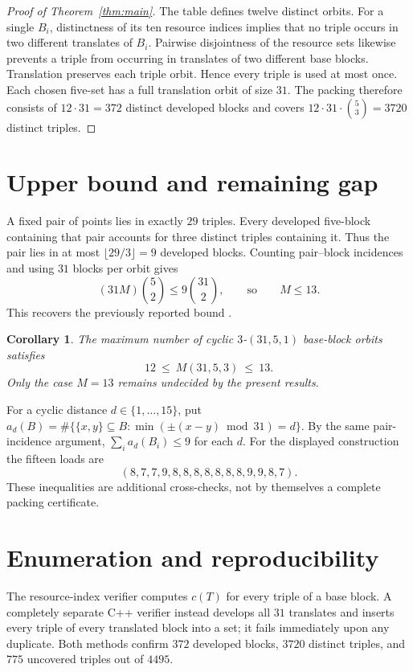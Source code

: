 \documentclass[11pt,a4paper]{article}
\newtheorem{corollary}{Corollary}
\begin{document}
\begin{proof}[Proof of Theorem~\ref{thm:main}]
The table defines twelve distinct orbits. For a single $B_i$,
distinctness of its ten resource indices implies that no triple occurs
in two different translates of $B_i$. Pairwise disjointness of the
resource sets likewise prevents a triple from occurring in translates
of two different base blocks. Translation preserves each triple orbit.
Hence every triple is used at most once. Each chosen five-set has a
full translation orbit of size $31$. The packing therefore consists of
$12\cdot31=372$ distinct developed blocks and covers
$12\cdot31\cdot\binom53=3720$ distinct triples.
\end{proof}

\section{Upper bound and remaining gap}
A fixed pair of points lies in exactly $29$ triples. Every developed
five-block containing that pair accounts for three distinct triples
containing it. Thus the pair lies in at most $\lfloor29/3\rfloor=9$
developed blocks. Counting pair--block incidences and using $31$ blocks
per orbit gives
\[
 (31M)\binom{5}{2}\leq 9\binom{31}{2},
 \qquad\text{so}\qquad M\leq13.
\]
This recovers the previously reported bound \cite{theoremdb,bailey}.

\begin{corollary}
The maximum number of cyclic $3$-$(31,5,1)$ base-block orbits satisfies
\[\boxed{12\ \leq\ M(31,5,3)\ \leq\ 13}.\]
Only the case $M=13$ remains undecided by the present results.
\end{corollary}

For a cyclic distance $d\in\{1,\ldots,15\}$, put
$a_d(B)=\#\{\{x,y\}\subseteq B:\min(\pm(x-y)\bmod31)=d\}$.
By the same pair-incidence argument,
$\sum_i a_d(B_i)\leq9$ for each $d$. For the displayed construction the
fifteen loads are
\[
(8,7,7,9,8,8,8,8,8,8,8,9,9,8,7).
\]
These inequalities are additional cross-checks, not by themselves a
complete packing certificate.

\section{Enumeration and reproducibility}
The resource-index verifier computes $c(T)$ for every triple of a base
block. A completely separate C++ verifier instead develops all
$31$ translates and inserts every triple of every translated block into
a set; it fails immediately upon any duplicate. Both methods confirm
$372$ developed blocks, $3720$ distinct triples, and $775$ uncovered
triples out of $4495$.
\end{document}
